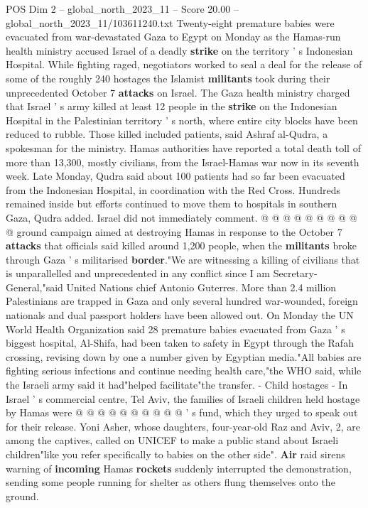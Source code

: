 \begin{textsample}{POS Dim 2 – global\_north\_2023\_11 – Score 20.00 – global\_north\_2023\_11/103611240.txt}  \label{ex:f2_pos_308}
Twenty-eight premature babies were evacuated from war-devastated Gaza to Egypt on Monday as the Hamas-run health ministry accused Israel of a deadly \textbf{strike} on the territory ' s Indonesian Hospital.
While fighting raged, negotiators worked to seal a deal for the release of some of the roughly 240 hostages the Islamist \textbf{militants} took during their unprecedented October 7 \textbf{attacks} on Israel.
The Gaza health ministry charged that Israel ' s army killed at least 12 people in the \textbf{strike} on the Indonesian Hospital in the Palestinian territory ' s north, where entire city blocks have been reduced to rubble.
Those killed included patients, said Ashraf al-Qudra, a spokesman for the ministry.
Hamas authorities have reported a total death toll of more than 13,300, mostly civilians, from the Israel-Hamas war now in its seventh week.
Late Monday, Qudra said about 100 patients had so far been evacuated from the Indonesian Hospital, in coordination with the Red Cross.
Hundreds remained inside but efforts continued to move them to hospitals in southern Gaza, Qudra added.
Israel did not immediately comment. @ @ @ @ @ @ @ @ @ @ ground campaign aimed at destroying Hamas in response to the October 7 \textbf{attacks} that officials said killed around 1,200 people, when the \textbf{militants} broke through Gaza ' s militarised \textbf{border}."We are witnessing a killing of civilians that is unparallelled and unprecedented in any conflict since I am Secretary-General,"said United Nations chief Antonio Guterres.
More than 2.4 million Palestinians are trapped in Gaza and only several hundred war-wounded, foreign nationals and dual passport holders have been allowed out.
On Monday the UN World Health Organization said 28 premature babies evacuated from Gaza ' s biggest hospital, Al-Shifa, had been taken to safety in Egypt through the Rafah crossing, revising down by one a number given by Egyptian media."All babies are fighting serious infections and continue needing health care,"the WHO said, while the Israeli army said it had"helped facilitate"the transfer. - Child hostages - In Israel ' s commercial centre, Tel Aviv, the families of Israeli children held hostage by Hamas were @ @ @ @ @ @ @ @ @ @ ' s fund, which they urged to speak out for their release.
Yoni Asher, whose daughters, four-year-old Raz and Aviv, 2, are among the captives, called on UNICEF to make a public stand about Israeli children"like you refer specifically to babies on the other side". \textbf{Air} raid sirens warning of \textbf{incoming} Hamas \textbf{rockets} suddenly interrupted the demonstration, sending some people running for shelter as others flung themselves onto the ground.

\end{textsample}
